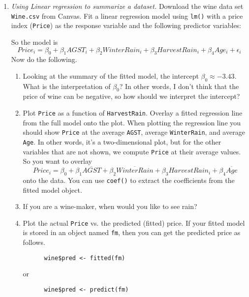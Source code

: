 \documentclass[12pt]{book}
\begin{document}
\begin{enumerate}

\item \emph{Using Linear regression to summarize a dataset.}
  Download the wine data set \texttt{Wine.csv} from Canvas. Fit a
  linear regression model using \texttt{lm()} with a price index
  (\texttt{Price}) as the response variable and the following
  predictor variables:
    So the model is
    \[ Price_i = \beta_0 + \beta_1 AGST_i + \beta_2 WinterRain_i +
      \beta_3 HarvestRain_i + \beta_4 Age_i + \epsilon_i \]
    Now do the following.
    \begin{enumerate}
    \item Looking at the summary of the fitted model, the intercept
      $\beta_0 \approx -3.43$. What is the interpretation of $\beta_0$?
      In other words, I don't think that the price of wine can be negative,
      so how should we interpret the intercept?
  \item Plot \texttt{Price} as a function of
    \texttt{HarvestRain}. Overlay a fitted regression line from the
    full model onto the plot.  When plotting the regression line you
    should show \texttt{Price} at the average \texttt{AGST}, average
    \texttt{WinterRain}, and average \texttt{Age}.
    In other words, it's a two-dimensional plot, but for the other
    variables that are not shown, we compute \texttt{Price} at their
    average values. So you want to overlay
    \[ Price_i = \beta_0 + \beta_1 \overline{AGST} +
      \beta_2 \overline{WinterRain} +
      \beta_3 HarvestRain_i +
      \beta_4 \overline{Age} \]
    onto the data. You can use \texttt{coef()} to extract the
    coefficients from the fitted model object.

  \item If you are a wine-maker, when would you like to see
    rain?

  \item Plot the actual \texttt{Price} vs. the predicted (fitted)
    price. If your fitted model is stored in an object named
    \texttt{fm}, then you can get the predicted price as follows.
    \begin{Verbatim}
      wine$pred <- fitted(fm)
    \end{Verbatim}
    or
    \begin{Verbatim}
      wine$pred <- predict(fm)
    \end{Verbatim}


\end{enumerate}
\end{enumerate}
\end{document}
